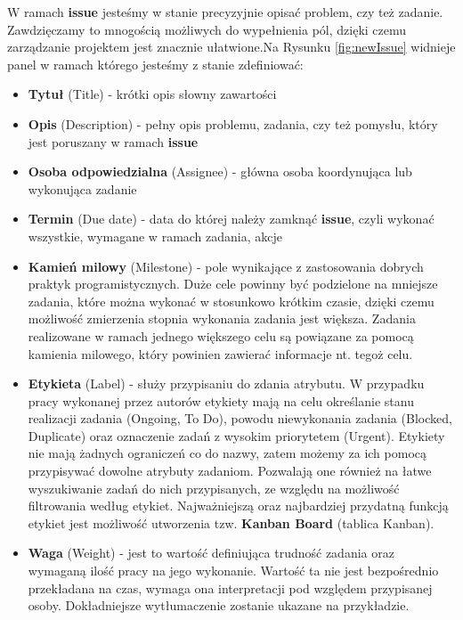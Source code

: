 W ramach \textbf{issue} jesteśmy w stanie precyzyjnie opisać problem, czy też zadanie. Zawdzięczamy to mnogością możliwych do wypełnienia pól, dzięki czemu zarządzanie projektem jest znacznie ułatwione.Na Rysunku \ref{fig:newIssue} widnieje panel w ramach którego jesteśmy z stanie zdefiniować:
\begin{itemize}
\item \textbf{Tytuł} (Title) - krótki opis słowny zawartości
\item \textbf{Opis} (Description) - pełny opis problemu, zadania, czy też pomysłu, który jest poruszany w ramach \textbf{issue}
\item \textbf{Osoba odpowiedzialna} (Assignee) - główna osoba koordynująca lub wykonująca zadanie
\item \textbf{Termin} (Due date) - data do której należy zamknąć \textbf{issue}, czyli wykonać wszystkie, wymagane w ramach zadania, akcje
\item \textbf{Kamień milowy} (Milestone) - pole wynikające z zastosowania dobrych praktyk programistycznych. Duże cele powinny być podzielone na mniejsze zadania, które można wykonać w stosunkowo krótkim czasie, dzięki czemu możliwość zmierzenia stopnia wykonania zadania jest większa. Zadania realizowane w ramach jednego większego celu są powiązane za pomocą kamienia milowego, który powinien zawierać informacje nt. tegoż celu.
\item \textbf{Etykieta} (Label) - służy przypisaniu do zdania atrybutu. W przypadku pracy wykonanej przez autorów etykiety mają na celu określanie stanu realizacji zadania (Ongoing, To Do), powodu niewykonania zadania (Blocked, Duplicate) oraz oznaczenie zadań z wysokim priorytetem (Urgent). Etykiety nie mają żadnych ograniczeń co do nazwy, zatem możemy za ich pomocą przypisywać dowolne atrybuty zadaniom. Pozwalają one również na łatwe wyszukiwanie zadań do nich przypisanych, ze względu na możliwość filtrowania według etykiet. Najważniejszą oraz najbardziej przydatną funkcją etykiet jest możliwość utworzenia tzw. \textbf{Kanban Board} (tablica Kanban).
\item \textbf{Waga} (Weight) - jest to wartość definiująca trudność zadania oraz wymaganą ilość pracy na jego wykonanie. Wartość ta nie jest bezpośrednio przekładana na czas, wymaga ona interpretacji pod względem przypisanej osoby. Dokładniejsze wytłumaczenie zostanie ukazane na przykładzie.
\end{itemize}


